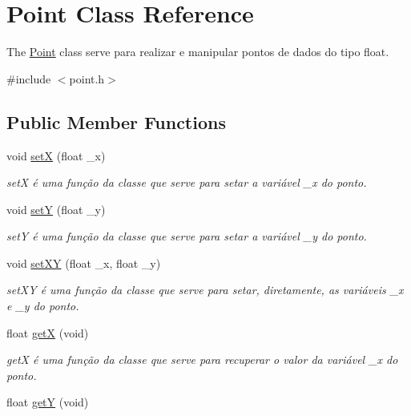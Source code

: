 \hypertarget{class_point}{}\section{Point Class Reference}
\label{class_point}


The \mbox{\hyperlink{class_point}{Point}} class serve para realizar e manipular pontos de dados do tipo float.  




{\ttfamily \#include $<$point.\+h$>$}

\subsection*{Public Member Functions}
\begin{DoxyCompactItemize}
\item 
void \mbox{\hyperlink{class_point_a428a1676e2fdec6753c42011a1d59d18}{setX}} (float \+\_\+x)
\begin{DoxyCompactList}\small\item\em setX é uma função da classe que serve para setar a variável \+\_\+x do ponto. \end{DoxyCompactList}\item 
void \mbox{\hyperlink{class_point_a9868c4601b0ea0c2d0de20fe41ee0e49}{setY}} (float \+\_\+y)
\begin{DoxyCompactList}\small\item\em setY é uma função da classe que serve para setar a variável \+\_\+y do ponto. \end{DoxyCompactList}\item 
void \mbox{\hyperlink{class_point_ab5385c6d9bfa841e641e4709fc9f14cc}{set\+XY}} (float \+\_\+x, float \+\_\+y)
\begin{DoxyCompactList}\small\item\em set\+XY é uma função da classe que serve para setar, diretamente, as variáveis \+\_\+x e \+\_\+y do ponto. \end{DoxyCompactList}\item 
float \mbox{\hyperlink{class_point_a9aa94b8fd07296e64d304ef3750db113}{getX}} (void)
\begin{DoxyCompactList}\small\item\em getX é uma função da classe que serve para recuperar o valor da variável \+\_\+x do ponto. \end{DoxyCompactList}\item 
float \mbox{\hyperlink{class_point_a2444daa96871c89614510bc4bfcd19ce}{getY}} (void)

\end{DoxyCompactItemize}
